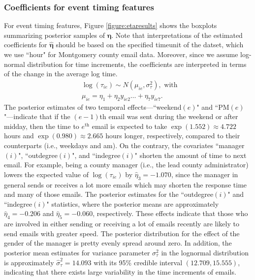 \documentclass[ba]{imsart}
\numberwithin{equation}{section}
\theoremstyle{plain}
\begin{document}
	\subsubsection{Coefficients for event timing features}
	For event timing features, Figure \ref{figure:etaresults} shows the boxplots summarizing posterior samples of $\boldsymbol{\eta}$. Note that interpretations of the estimated coefficients for $\hat{\boldsymbol{\eta}}$ should be based on the specified timeunit of the datset, which we use ``hour" for Montgomery county email data. Moreover, since we assume log-normal distribution for time increments, the coefficients are interpreted in terms of the change in the average log time.
	\begin{equation*}
		\begin{aligned}
			&\log(\tau_{ie}) \sim N(\mu_{ie}, \sigma_\tau^2), \mbox{ with }\\
			&\mu_{ie} = \eta_{1}+\eta_{2} y_{ie2}\ldots+\eta_{7}y_{ie7}.
		\end{aligned}
	\end{equation*}
	The posterior estimates of two temporal effects---``weekend$(e)$" and ``PM$(e)$"---indicate that if the ${(e-1)}$th email was sent during the weekend or after midday, then the time to $e^{\textrm{th}}$ email is expected to take $\exp(1.552)\approx 4.722$ hours and $\exp(0.980)\approx2.665$ hours longer, respectively, compared to their counterparts (i.e., weekdays and am). On the contrary, the covariates ``manager$(i)$", ``outdegree$(i)$", and ``indegree$(i)$"  shorten the amount of time to next email. For example, being a county manager (i.e., the lead county administrator) lowers the expected value of $\log(\tau_{ie})$ by $\hat{\eta}_3 = -1.070$, since the manager in general sends or receives a lot more emails which may shorten the response time and many of those emails. The posterior estimates for the  ``outdegree$(i)$" and ``indegree$(i)$" statistics, where the posterior means are approximately $\hat{\eta}_4=-0.206$ and $\hat{\eta}_5=-0.060$, respectively. These effects indicate that those who are involved in either sending or receiving a lot of emails recently are likely to send emails with greater speed. The posterior distribution for the effect of the gender of the manager is pretty evenly spread around zero. In addition, the posterior mean estimates for variance parameter $\sigma^2_\tau$ in the lognormal distribution is approximately $\hat{\sigma}^2_\tau=14.093$ with its 95\% credible interval $(12.709, 15.555)$, indicating that there exists large variability in the time increments of emails.
\end{document}
